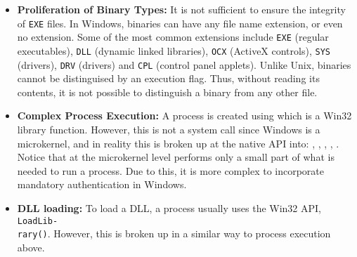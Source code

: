 \begin{itemize}
\item {\bf Proliferation of Binary Types:}
It is not sufficient to ensure the integrity of {\tt EXE} files.
In Windows, binaries can have any file name extension, or even no extension.
Some of the most common extensions include {\tt EXE} (regular
executables), {\tt DLL} (dynamic linked libraries), {\tt OCX} 
(ActiveX controls), {\tt SYS} (drivers), {\tt DRV} (drivers)
and {\tt CPL} (control panel applets).
Unlike Unix, binaries cannot be distinguised by an execution flag.
Thus, without reading its contents,
it is not possible to distinguish a binary from any other file.

\item {\bf Complex Process Execution:}
A process is created using  which is a Win32 library
function. However, this is not a system call since Windows is a microkernel,
and in reality this is broken up at the native API into:
, , ,
, .
Notice that  at the microkernel level
performs only a small part of what is needed to run a process.
Due to this, it is more complex to incorporate mandatory authentication in Windows.

\item {\bf DLL loading:}
To load a DLL, a process usually uses the Win32 API, {\tt LoadLib-\\rary()}.
However, this is broken up in a similar way to process execution above.



\end{itemize}
